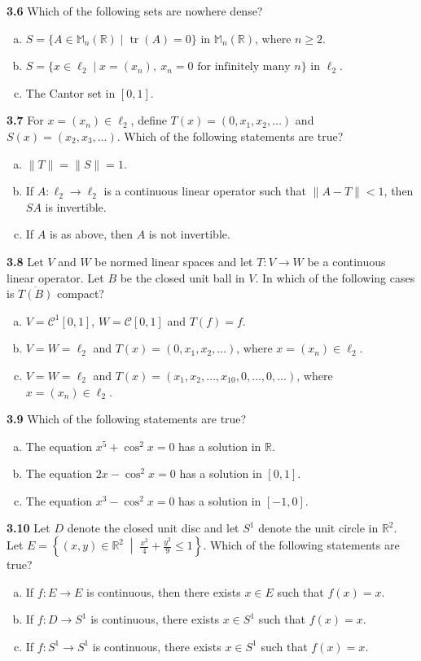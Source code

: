 \documentclass[11pt,a4paper]{article}
\newcommand{\R}{\mathbb{R}}
\newcommand{\M}{\mathbb{M}}
\newcommand{\tr}{\operatorname{tr}}
\newcommand{\qitem}[1]{\par\medskip\noindent\textbf{#1}\hspace{0.5em}}
\begin{document}
\qitem{3.6} Which of the following sets are nowhere dense?
\begin{enumerate}[a.]
  \item $S = \{A \in \M_n(\R) \mid \tr(A) = 0\}$ in $\M_n(\R)$, where $n \ge 2$.
  \item $S = \{x \in \ell_2 \mid x = (x_n),\ x_n = 0 \text{ for infinitely many } n\}$ in $\ell_2$.
  \item The Cantor set in $[0, 1]$.
\end{enumerate}

\qitem{3.7} For $x = (x_n) \in \ell_2$, define $T(x) = (0, x_1, x_2, \dots)$ and $S(x) = (x_2, x_3, \dots)$. Which of the following statements are true?
\begin{enumerate}[a.]
  \item $\|T\| = \|S\| = 1$.
  \item If $A : \ell_2 \to \ell_2$ is a continuous linear operator such that $\|A - T\| < 1$, then $SA$ is invertible.
  \item If $A$ is as above, then $A$ is not invertible.
\end{enumerate}

\qitem{3.8} Let $V$ and $W$ be normed linear spaces and let $T : V \to W$ be a continuous linear operator. Let $B$ be the closed unit ball in $V$. In which of the following cases is $\overline{T(B)}$ compact?
\begin{enumerate}[a.]
  \item $V = \mathcal{C}^1[0, 1]$, $W = \mathcal{C}[0, 1]$ and $T(f) = f$.
  \item $V = W = \ell_2$ and $T(x) = (0, x_1, x_2, \dots)$, where $x = (x_n) \in \ell_2$.
  \item $V = W = \ell_2$ and $T(x) = (x_1, x_2, \dots, x_{10}, 0, \dots, 0, \dots)$, where $x = (x_n) \in \ell_2$.
\end{enumerate}

\qitem{3.9} Which of the following statements are true?
\begin{enumerate}[a.]
  \item The equation $x^5 + \cos^2 x = 0$ has a solution in $\R$.
  \item The equation $2x - \cos^2 x = 0$ has a solution in $[0, 1]$.
  \item The equation $x^3 - \cos^2 x = 0$ has a solution in $[-1, 0]$.
\end{enumerate}

\qitem{3.10} Let $D$ denote the closed unit disc and let $S^1$ denote the unit circle in $\R^2$. Let $E = \left\{(x, y) \in \R^2 \;\middle|\; \frac{x^2}{4} + \frac{y^2}{9} \le 1\right\}$. Which of the following statements are true?
\begin{enumerate}[a.]
  \item If $f : E \to E$ is continuous, then there exists $x \in E$ such that $f(x) = x$.
  \item If $f : D \to S^1$ is continuous, there exists $x \in S^1$ such that $f(x) = x$.
  \item If $f : S^1 \to S^1$ is continuous, there exists $x \in S^1$ such that $f(x) = x$.
\end{enumerate}
\end{document}
